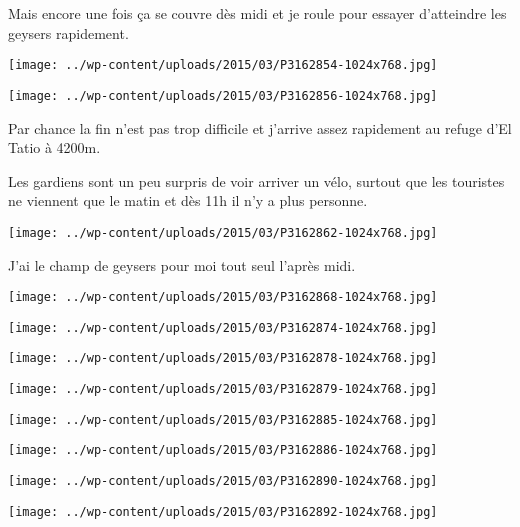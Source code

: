 \pagebreak
Mais encore une fois ça se couvre dès midi et je roule pour essayer d'atteindre les geysers rapidement. 
\begin{center} \texttt{[image: ../wp-content/uploads/2015/03/P3162854-1024x768.jpg]} \end{center}
\begin{center} \texttt{[image: ../wp-content/uploads/2015/03/P3162856-1024x768.jpg]} \end{center}

 Par chance la fin n'est pas trop difficile et j'arrive assez rapidement au refuge d'El Tatio à 4200m. 

\pagebreak
 Les gardiens sont un peu surpris de voir arriver un vélo, surtout que les touristes ne viennent que le matin et dès 11h il n'y a plus personne. 
\begin{center} \texttt{[image: ../wp-content/uploads/2015/03/P3162862-1024x768.jpg]} \end{center}

 J'ai le champ de geysers pour moi tout seul l'après midi. 
\begin{center} \texttt{[image: ../wp-content/uploads/2015/03/P3162868-1024x768.jpg]} \end{center}
\begin{center} \texttt{[image: ../wp-content/uploads/2015/03/P3162874-1024x768.jpg]} \end{center}
\begin{center} \texttt{[image: ../wp-content/uploads/2015/03/P3162878-1024x768.jpg]} \end{center}
\begin{center} \texttt{[image: ../wp-content/uploads/2015/03/P3162879-1024x768.jpg]} \end{center}
\begin{center} \texttt{[image: ../wp-content/uploads/2015/03/P3162885-1024x768.jpg]} \end{center}
\begin{center} \texttt{[image: ../wp-content/uploads/2015/03/P3162886-1024x768.jpg]} \end{center}
\begin{center} \texttt{[image: ../wp-content/uploads/2015/03/P3162890-1024x768.jpg]} \end{center}
\begin{center} \texttt{[image: ../wp-content/uploads/2015/03/P3162892-1024x768.jpg]} \end{center}

